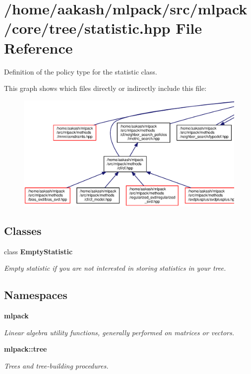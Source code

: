 \section{/home/aakash/mlpack/src/mlpack/core/tree/statistic.hpp File Reference}
\label{statistic_8hpp}


Definition of the policy type for the statistic class.  


This graph shows which files directly or indirectly include this file\+:
\nopagebreak
\begin{figure}[H]
\begin{center}
\leavevmode
\includegraphics[width=350pt]{statistic_8hpp__dep__incl}
\end{center}
\end{figure}
\subsection*{Classes}
\begin{DoxyCompactItemize}
\item 
class \textbf{ Empty\+Statistic}
\begin{DoxyCompactList}\small\item\em Empty statistic if you are not interested in storing statistics in your tree. \end{DoxyCompactList}\end{DoxyCompactItemize}
\subsection*{Namespaces}
\begin{DoxyCompactItemize}
\item 
 \textbf{ mlpack}
\begin{DoxyCompactList}\small\item\em Linear algebra utility functions, generally performed on matrices or vectors. \end{DoxyCompactList}\item 
 \textbf{ mlpack\+::tree}
\begin{DoxyCompactList}\small\item\em Trees and tree-\/building procedures. \end{DoxyCompactList}\end{DoxyCompactItemize}



